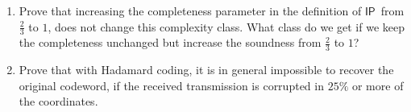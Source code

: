 \documentclass[usletter]{article}
\newcommand {\family}[1]       {\ensuremath{\mathsf{#1}}}
\newcommand {\IP}     {\family{IP}}
\begin{document}
\begin{enumerate}[labelsep=2.5em, label=\textbf{\arabic{enumi}}]
  \item Prove that increasing the completeness parameter in the definition of
        \IP\ from $\frac{2}{3}$ to $1$, does not change this complexity class.
        What class do we get if we keep the completeness unchanged but increase
        the soundness from $\frac{2}{3}$ to $1$?


  \item Prove that with Hadamard coding, it is in general impossible to recover
        the original codeword, if the received transmission is corrupted in
        $25\%$ or more of the coordinates.

\end{enumerate}



\end{document}
